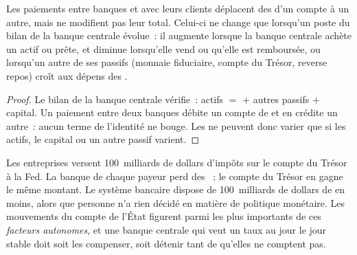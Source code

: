 \begin{proposition}\label{prop:m2:central-banks-and-the-short-rate:total}
Les paiements entre banques et avec leurs clients déplacent des  d'un compte à un autre, mais
ne modifient pas leur total. Celui-ci ne change que lorsqu'un poste du bilan de la
banque centrale évolue~: il augmente lorsque la banque centrale achète un actif ou
prête, et diminue lorsqu'elle vend ou qu'elle est remboursée, ou lorsqu'un autre de ses
passifs (monnaie fiduciaire, compte du Trésor, reverse repos) croît aux dépens des
.
\end{proposition}
\begin{proof}
Le bilan de la banque centrale vérifie~: actifs $=$  $+$ autres
passifs $+$ capital. Un paiement entre deux banques débite un compte de 
et en crédite un autre~: aucun terme de l'identité ne bouge. Les  ne peuvent
donc varier que si les actifs, le capital ou un autre passif varient.
\end{proof}

\begin{example}\label{ex:m2:central-banks-and-the-short-rate:tax}
Les entreprises versent 100~milliards de dollars d'impôts sur le compte du Trésor à la Fed.
La banque de chaque payeur perd des ~; le compte du Trésor en gagne le
même montant. Le système bancaire dispose de 100~milliards de dollars de  en moins, alors que
personne n'a rien décidé en matière de politique monétaire. Les mouvements
du compte de l'État figurent parmi les plus importants de ces \emph{facteurs autonomes}, et une banque centrale
qui veut un taux au jour le jour stable doit soit les compenser, soit détenir
tant de  qu'elles ne comptent pas.
\end{example}

